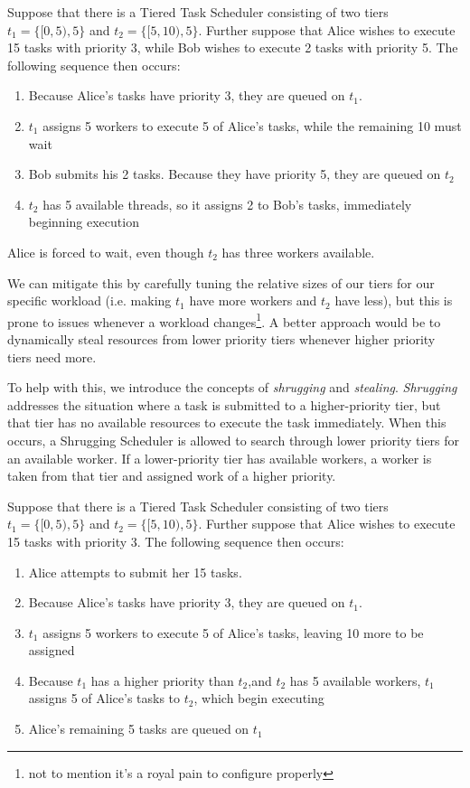 \begin{exmp}
Suppose that there is a Tiered Task Scheduler consisting of two tiers $t_1 = \{[0,5),5\}$ and $t_2 = \{[5,10),5\}$. Further suppose that Alice wishes to execute 15 tasks with priority 3, while Bob wishes to execute 2 tasks with priority 5. The following sequence then occurs:

\begin{enumerate}
\item Because Alice's tasks have priority 3, they are queued on $t_1$.
\item $t_1$ assigns 5 workers to execute 5 of Alice's tasks, while the remaining 10 must wait
\item Bob submits his 2 tasks. Because they have priority 5, they are queued on $t_2$
\item $t_2$ has 5 available threads, so it assigns 2 to Bob's tasks, immediately beginning execution
\end{enumerate}
Alice is forced to wait, even though $t_2$ has three workers available.
\end{exmp}

We can mitigate this by carefully tuning the relative sizes of our tiers for our specific workload (i.e. making $t_1$ have more workers and $t_2$ have less), but this is prone to issues whenever a workload changes\footnote{not to mention it's a royal pain to configure properly}. A better approach would be to dynamically steal resources from lower priority tiers whenever higher priority tiers need more.

To help with this, we introduce the concepts of \emph{shrugging} and \emph{stealing}. \emph{Shrugging} addresses the situation where a task is submitted to a higher-priority tier, but that tier has no available resources to execute the task immediately. When this occurs, a Shrugging Scheduler is allowed to search through lower priority tiers for an available worker. If a lower-priority tier has available workers, a worker is taken from that tier and assigned work of a higher priority.

\begin{exmp}
Suppose that there is a Tiered Task Scheduler consisting of two tiers $t_1 = \{[0,5),5\}$ and $t_2 = \{[5,10),5\}$. Further suppose that Alice wishes to execute 15 tasks with priority 3. The following sequence then occurs:

\begin{enumerate}
\item Alice attempts to submit her 15 tasks.
\item Because Alice's tasks have priority 3, they are queued on $t_1$.
\item $t_1$ assigns 5 workers to execute 5 of Alice's tasks, leaving 10 more to be assigned
\item Because $t_1$ has a higher priority than $t_2$,and $t_2$ has 5 available workers, $t_1$ assigns 5 of Alice's tasks to $t_2$, which begin executing
\item Alice's remaining 5 tasks are queued on $t_1$
\end{enumerate}

\end{exmp}


